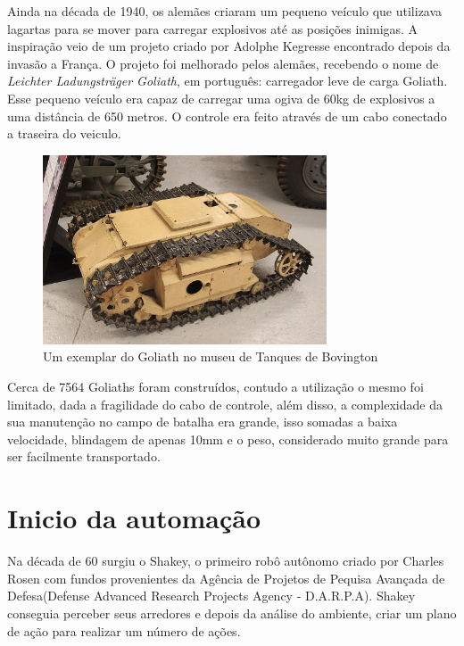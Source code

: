 Ainda na década de 1940, os alemães criaram um pequeno veículo que utilizava lagartas para se mover para carregar explosivos até as posições inimigas. A inspiração veio de um projeto criado por Adolphe Kegresse encontrado depois da invasão a França. O projeto foi melhorado pelos alemães, recebendo o nome de \textit{Leichter Ladungsträger Goliath}, em português: carregador leve de carga Goliath. Esse pequeno veículo era capaz de carregar uma ogiva de 60kg de explosivos a uma distância de 650 metros. O controle era feito através de um cabo conectado a traseira do veiculo. 
\begin{figure}[!htb]
    \centering
    \includegraphics[width=0.75\textwidth]{figuras/goliath.JPG}
    \caption{Um exemplar do Goliath no museu de Tanques de Bovington}
    \label{fig:goliath:museu}
\end{figure}
Cerca de 7564 Goliaths foram construídos, contudo a utilização o mesmo foi limitado, dada a fragilidade do cabo de controle, além disso, a complexidade da sua manutenção no campo de batalha era grande, isso somadas a baixa velocidade, blindagem de apenas 10mm e o peso, considerado muito grande para ser facilmente transportado.
\section{Inicio da automação}
Na década de 60 surgiu o Shakey, o primeiro robô autônomo criado por Charles Rosen com fundos provenientes da Agência de Projetos de Pequisa Avançada de Defesa(Defense Advanced Research Projects Agency - D.A.R.P.A). Shakey conseguia perceber seus arredores e depois da análise do ambiente, criar um plano de ação para realizar um número de ações. 

